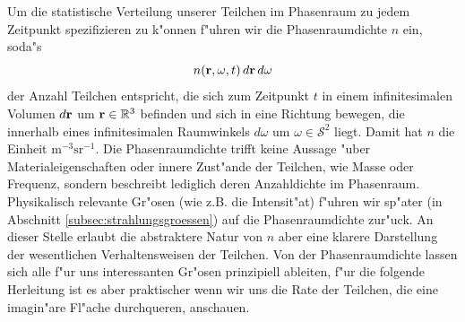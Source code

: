 \documentclass[11pt,a4paper,DIVcalc,BCOR8mm,titlepage,twoside]{scrartcl}
\begin{document}
	Um die statistische Verteilung unserer Teilchen im Phasenraum zu jedem Zeitpunkt spezifizieren zu k"onnen f"uhren wir die Phasenraumdichte $n$ ein, soda"s $$n(\mathbf{r},\omega,t)\,d\mathbf{r}\,d\omega$$ der Anzahl Teilchen entspricht, die sich zum Zeitpunkt $t$ in einem infinitesimalen Volumen $d\mathbf{r}$ um $\mathbf{r} \in \mathbb{R}^3$ befinden und sich in eine Richtung bewegen, die innerhalb eines infinitesimalen Raumwinkels $d\omega$ um $\omega \in \mathcal{S}^2$ liegt. Damit hat $n$ die Einheit $\text{m}^{-3}\text{sr}^{-1}$. Die Phasenraumdichte trifft keine Aussage "uber Materialeigenschaften oder innere Zust"ande der Teilchen, wie Masse oder Frequenz, sondern beschreibt lediglich deren Anzahldichte im Phasenraum. Physikalisch relevante Gr"osen (wie z.B. die Intensit"at) f"uhren wir sp"ater (in Abschnitt \ref{subsec:strahlungsgroessen}) auf die Phasenraumdichte zur"uck. An dieser Stelle erlaubt die abstraktere Natur von $n$ aber eine klarere Darstellung der wesentlichen Verhaltensweisen der Teilchen. Von der Phasenraumdichte lassen sich alle f"ur uns interessanten Gr"osen prinzipiell ableiten, f"ur die folgende Herleitung ist es aber praktischer wenn wir uns die Rate der Teilchen, die eine imagin"are Fl"ache durchqueren, anschauen.
	
\end{document}
